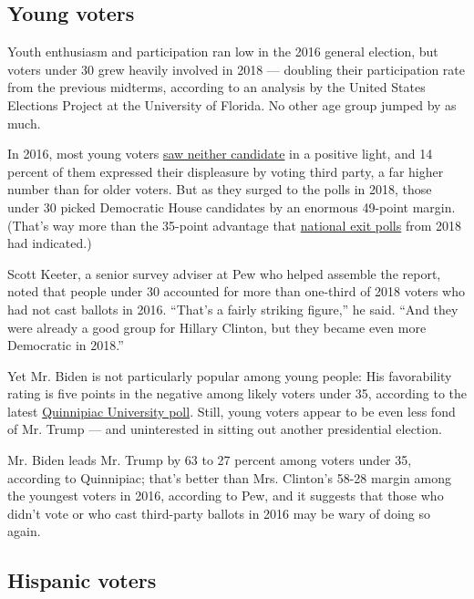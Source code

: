 \hypertarget{young-voters}{%
\subsection{Young voters}\label{young-voters}}

Youth enthusiasm and participation ran low in the 2016 general election,
but voters under 30 grew heavily involved in 2018 --- doubling their
participation rate from the previous midterms, according to an analysis
by the United States Elections Project at the University of Florida. No
other age group jumped by as much.

In 2016, most young voters
\href{https://www.monmouth.edu/polling-institute/documents/monmouthpoll_us_110716.pdf/}{saw
neither candidate} in a positive light, and 14 percent of them expressed
their displeasure by voting third party, a far higher number than for
older voters. But as they surged to the polls in 2018, those under 30
picked Democratic House candidates by an enormous 49-point margin.
(That's way more than the 35-point advantage that
\href{https://www.cnn.com/election/2018/exit-polls}{national exit polls}
from 2018 had indicated.)

Scott Keeter, a senior survey adviser at Pew who helped assemble the
report, noted that people under 30 accounted for more than one-third of
2018 voters who had not cast ballots in 2016. ``That's a fairly striking
figure,'' he said. ``And they were already a good group for Hillary
Clinton, but they became even more Democratic in 2018.''

Yet Mr. Biden is not particularly popular among young people: His
favorability rating is five points in the negative among likely voters
under 35, according to the latest
\href{https://poll.qu.edu/images/polling/us/us09022020_udmp37.pdf}{Quinnipiac
University poll}. Still, young voters appear to be even less fond of Mr.
Trump --- and uninterested in sitting out another presidential election.

Mr. Biden leads Mr. Trump by 63 to 27 percent among voters under 35,
according to Quinnipiac; that's better than Mrs. Clinton's 58-28 margin
among the youngest voters in 2016, according to Pew, and it suggests
that those who didn't vote or who cast third-party ballots in 2016 may
be wary of doing so again.

\hypertarget{hispanic-voters}{%
\subsection{Hispanic voters}\label{hispanic-voters}}

